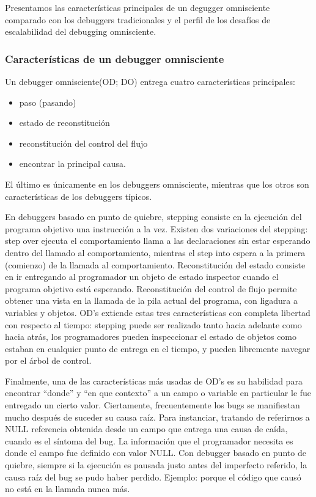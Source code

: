 \documentclass[12pt,a4paper]{report}
\begin{document}
	Presentamos las características principales de un degugger omnisciente comparado con los debuggers tradicionales y el perfil de los desafíos de escalabilidad del debugging omnisciente.

			\subsubsection[Características]{Características de un debugger omnisciente}

	Un debugger omnisciente(OD; DO) entrega cuatro características principales:
\begin{itemize}
	\item paso (pasando)
	\item estado de reconstitución
	\item reconstitución del control del flujo
	\item encontrar la principal causa.  
\end{itemize}
El último es únicamente en los debuggers omnisciente, mientras que los otros son características de los debuggers típicos.

	En debuggers basado en punto de quiebre, stepping consiste en la ejecución del programa objetivo una instrucción a la vez.  Existen dos variaciones del stepping:  step over ejecuta el comportamiento llama a las declaraciones sin estar esperando dentro del llamado al comportamiento, mientras el step into espera a la primera (comienzo) de la llamada al comportamiento.  Reconstitución del estado consiste en ir entregando al programador un objeto de estado inspector cuando el programa objetivo está esperando.  Reconstitución del control de flujo permite obtener una vista en la llamada de la pila actual del programa, con ligadura a variables y objetos.  OD's extiende estas tres características con completa libertad con respecto al tiempo:  stepping puede ser realizado tanto hacia adelante como hacia atrás, los programadores pueden inspeccionar el estado de objetos como estaban en cualquier punto de entrega en el tiempo, y pueden libremente navegar por el árbol de control.

	Finalmente, una de las características más usadas de OD's es su habilidad para encontrar “donde” y “en que contexto” a un campo o variable en particular le fue entregado un cierto valor.  Ciertamente, frecuentemente los bugs se manifiestan mucho después de suceder su causa raíz.  Para instanciar, tratando de referirnos a NULL referencia obtenida desde un campo que entrega una causa de caída, cuando es el síntoma del bug.  La información que el programador necesita es donde el campo fue definido con valor NULL.  Con debugger basado en punto de quiebre, siempre si la ejecución es pausada justo antes del imperfecto referido, la causa raíz del bug se pudo haber perdido.  Ejemplo:  porque el código que causó no está en la llamada nunca más.
\end{document}
